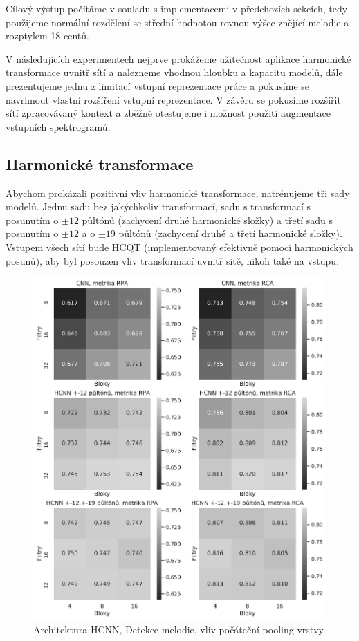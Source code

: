 Cílový výstup počítáme v souladu s implementacemi v předchozích sekcích, tedy použijeme normální rozdělení se střední hodnotou rovnou výšce znějící melodie a rozptylem 18 centů.

V následujících experimentech nejprve prokážeme užitečnost aplikace harmonické transformace uvnitř sítí a nalezneme vhodnou hloubku a kapacitu modelů, dále prezentujeme jednu z limitací vstupní reprezentace práce \cite{Bittner2017} a pokusíme se navrhnout vlastní rozšíření vstupní reprezentace. V závěru se pokusíme rozšířit sítí zpracovávaný kontext a zběžně otestujeme i možnost použití augmentace vstupních spektrogramů.

\subsection{Harmonické transformace}

Abychom prokázali pozitivní vliv harmonické transformace, natrénujeme tři sady modelů. Jednu sadu bez jakýchkoliv transformací, sadu s transformací s posunutím o $\pm 12$ půltónů (zachycení druhé harmonické složky) a třetí sadu s posunutím o $\pm 12$ a o $\pm 19$ půltónů (zachycení druhé a třetí harmonické složky). Vstupem všech sítí bude HCQT (implementovaný efektivně pomocí harmonických posunů), aby byl posouzen vliv transformací uvnitř sítě, nikoli také na vstupu.

\begin{figure}[h!]\centering
    \includegraphics[scale=0.55]{../img/figures/spectrogram_harmonic_stacking_grey}
\caption{Architektura HCNN, Detekce melodie, vliv počáteční pooling vrstvy.}\label{obr:spectrogram_harmonic_stacking}
\end{figure}

